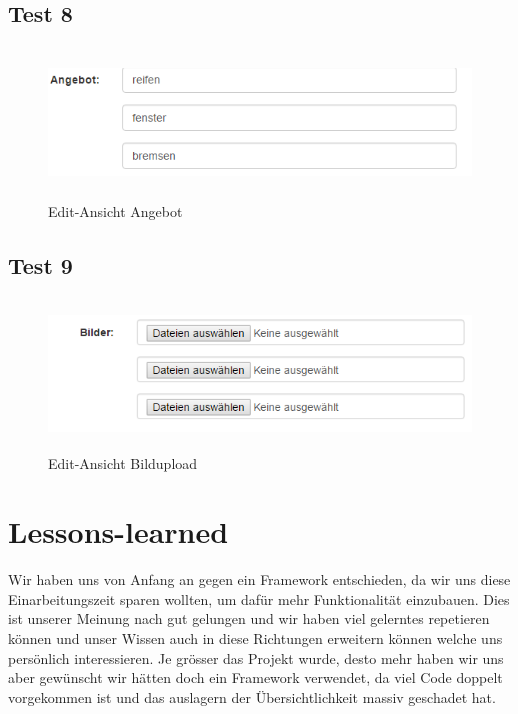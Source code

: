 \documentclass[11pt,a4paper]{scrreprt}
\begin{document}
{\section{Test 8}
\begin{figure}[H]
\includegraphics[height=4cm]{./Bilder/dienstleistung.png}
\centering
\caption{Edit-Ansicht Angebot}
\end{figure}
\section{Test 9}
\begin{figure}[H]
\includegraphics[height=4cm]{./Bilder/bilder.png}
\centering
\caption{Edit-Ansicht Bildupload}
\end{figure}

\newpage


\chapter{Lessons-learned}
Wir haben uns von Anfang an gegen ein Framework entschieden, 
da wir uns diese Einarbeitungszeit sparen wollten, um dafür mehr Funktionalität einzubauen. Dies ist unserer Meinung nach gut gelungen und wir haben viel gelerntes repetieren können und unser Wissen auch in diese Richtungen erweitern können welche uns persönlich interessieren. Je grösser das Projekt wurde, desto mehr haben wir uns aber gewünscht wir hätten doch ein Framework verwendet, da viel Code doppelt vorgekommen ist und das auslagern der Übersichtlichkeit massiv geschadet hat. 

}
\end{document}
